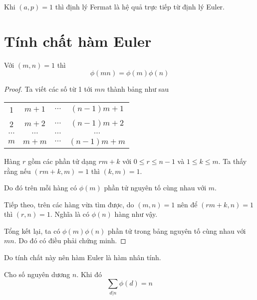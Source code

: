 \begin{remark}
    Khi $(a, p) = 1$ thì định lý Fermat là hệ quả trực tiếp từ định lý Euler.
\end{remark}

\section{Tính chất hàm Euler}

\begin{remark}
    Với $(m, n) = 1$ thì $$\phi(m n) = \phi(m) \phi(n)$$
\end{remark}

\begin{proof}
    Ta viết các số từ 1 tới $mn$ thành bảng như sau

    \begin{center}
        \begin{tabular}{c c c c}
            1 & $m+1$ & $\cdots$ & $(n-1)m + 1$ \\
            2 & $m+2$ & $\cdots$ & $(n-1)m + 2$ \\
            $\cdots$ & $\cdots$ & $\cdots$ & $\cdots$ \\
            $m$ & $m+m$ & $\cdots$ & $(n-1)m + m$
        \end{tabular}
    \end{center}
    
    Hàng $r$ gồm các phần tử dạng $r m + k$ với $0 \leq r \leq n-1$ và $1 \leq k \leq m$. 
    Ta thấy rằng nếu $(rm + k, m) = 1$ thì $(k, m) = 1$.

    Do đó trên mỗi hàng có $\phi(m)$ phần tử nguyên tố cùng nhau với $m$.

    Tiếp theo, trên các hàng vừa tìm được, do $(m, n) = 1$ nên để $(rm + k, n) = 1$ thì $(r, n) = 1$.
    Nghĩa là có $\phi(n)$ hàng như vậy.

    Tổng kết lại, ta có $\phi(m) \phi(n)$ phần tử trong bảng nguyên tố cùng nhau với $mn$. Do đó có điều phải chứng minh.
\end{proof}

Do tính chất này nên hàm Euler là hàm nhân tính.

\begin{remark}
    Cho số nguyên dương $n$. Khi đó
    \[\sum_{d | n} \phi(d) = n\]
\end{remark}

